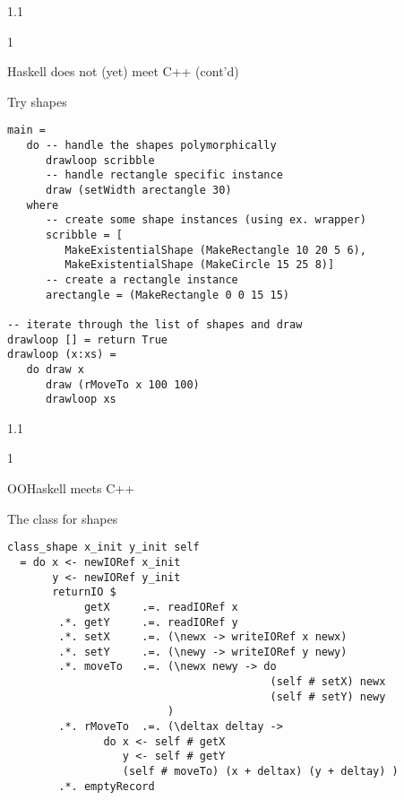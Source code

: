\documentclass{slides}
\newenvironment{myslide}{\begin{slide}\color{Blue}\begin{boxedminipage}{1.1\hsize}\begin{boxedminipage}{1\hsize}\color{Black}
\vspace{-170\in}
}{%
\smallskip
\end{boxedminipage}
\end{boxedminipage}
\end{slide}}
\newenvironment{myslide}{\begin{slide}
}{%
\end{slide}}
\newenvironment{myslide}{\begin{slide}\color{White}\begin{boxedminipage}{1.1\hsize}\color{Black}
\vspace{-170\in}
}{%
\smallskip
\end{boxedminipage}
\end{slide}}
\newcommand{\header}[1]{{\large \color{Red} #1}}
\begin{document}
\begin{myslide}

\header{Haskell does not (yet) meet C++ (cont'd)}

Try shapes

{\tiny

\begin{verbatim}
main =
   do -- handle the shapes polymorphically
      drawloop scribble
      -- handle rectangle specific instance
      draw (setWidth arectangle 30)
   where
      -- create some shape instances (using ex. wrapper)
      scribble = [
         MakeExistentialShape (MakeRectangle 10 20 5 6),
         MakeExistentialShape (MakeCircle 15 25 8)]
      -- create a rectangle instance
      arectangle = (MakeRectangle 0 0 15 15)

-- iterate through the list of shapes and draw
drawloop [] = return True
drawloop (x:xs) =
   do draw x
      draw (rMoveTo x 100 100)
      drawloop xs
\end{verbatim}

}

\end{myslide}






\begin{myslide}

\header{OOHaskell meets C++}

The class for shapes

{\tiny

\begin{verbatim}
class_shape x_init y_init self
  = do x <- newIORef x_init
       y <- newIORef y_init
       returnIO $
            getX     .=. readIORef x
        .*. getY     .=. readIORef y
        .*. setX     .=. (\newx -> writeIORef x newx)
        .*. setY     .=. (\newy -> writeIORef y newy)
        .*. moveTo   .=. (\newx newy -> do
                                         (self # setX) newx
                                         (self # setY) newy 
                         )
        .*. rMoveTo  .=. (\deltax deltay ->
               do x <- self # getX
                  y <- self # getY
                  (self # moveTo) (x + deltax) (y + deltay) )
        .*. emptyRecord
\end{verbatim}

}

\end{myslide}
\end{document}
